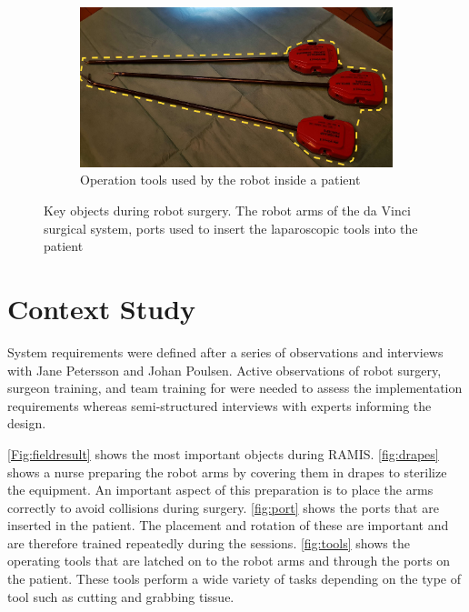 \documentclass[conference]{IEEEtran}
\begin{document}
\begin{figure}
	\begin{subfigure}[b]{0.48\textwidth}
		\includegraphics[width=\textwidth]{Figures/tools.pdf}
		\caption{Operation tools used by the robot inside a patient}
		\label{fig:tools}
	\end{subfigure}
	\caption{Key objects during robot surgery. The robot arms of the da Vinci surgical system, ports used to insert the laparoscopic tools into the patient}
	\label{Fig:fieldresult}
\end{figure}

\section{Context Study}
System requirements were defined after a series of observations and interviews with Jane Petersson and Johan Poulsen. Active observations of robot surgery, surgeon training, and team training for were needed to assess the implementation requirements whereas semi-structured interviews with experts informing the design. 

\autoref{Fig:fieldresult} shows the most important objects during RAMIS. \autoref{fig:drapes} shows a nurse preparing the robot arms by covering them in drapes to sterilize the equipment. An important aspect of this preparation is to place the arms correctly to avoid collisions during surgery. \autoref{fig:port} shows the ports that are inserted in the patient. The placement and rotation of these are important and are therefore trained repeatedly during the sessions. \autoref{fig:tools} shows the operating tools that are latched on to the robot arms and through the ports on the patient. These tools perform a wide variety of tasks depending on the type of tool such as cutting and grabbing tissue.
\end{document}
